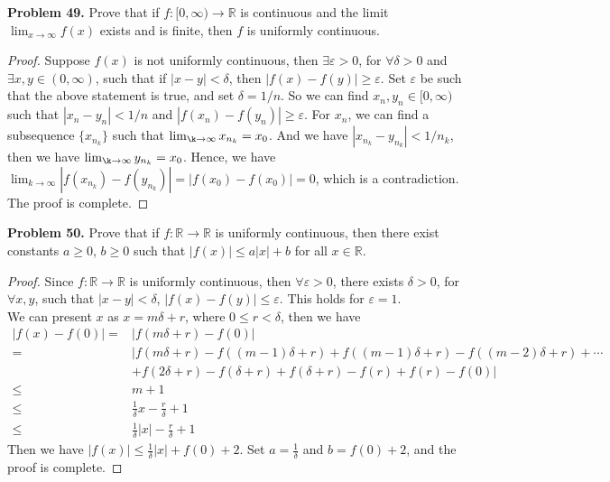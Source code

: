 \documentclass[12pt,leqno]{amsart}
\begin{document}
\medskip

\noindent
{\bf Problem 49.}
Prove that if $f:[0,\infty)\to\mathbb{R}$ is continuous and the limit $\lim_{x\to\infty} f(x)$ exists and is finite, then $f$ is uniformly continuous.
\begin{proof}
Suppose $f(x)$ is not uniformly continuous, then $\exists \varepsilon >0$, for $\forall \delta >0$ and $\exists x,y \in(0,\infty)$, such that if $|x-y|<\delta$, then $|f(x)-f(y)|\geq\varepsilon$. Set $\varepsilon$ be such that the above statement is true, and set $\delta = 1/n$. So we can find $x_n, y_n \in [0,\infty)$ such that $|x_n-y_n|<1/n$ and $|f(x_n)-f(y_n)|\geq \varepsilon$. For $x_n$, we can find a subsequence $\{x_{n_k}\}$ such that $\lim_{\k\to\infty} x_{n_k} = x_0$. And we have $|x_{n_k}-y_{n_k}|<1/n_k$, then we have $\lim_{\k\to\infty} y_{n_k} = x_0$. Hence, we have $\lim_{k\to\infty}|f(x_{n_k})-f(y_{n_k})|=|f(x_0)-f(x_0)|=0$, which is a contradiction. The proof is complete.
\end{proof}

\medskip

\noindent
{\bf Problem 50.}
Prove that if $f:\mathbb{R}\to\mathbb{R}$ is uniformly continuous, then there exist constants $a\geq 0$, $b\geq 0$ such that $\vert f(x)\vert \leq a\vert x\vert +b$ for all $x\in\mathbb{R}$.
\begin{proof}
Since $f:\mathbb{R}\to\mathbb{R}$ is uniformly continuous, then $\forall \varepsilon > 0$, there exists $\delta >0$, for $\forall x,y$, such that $|x-y|<\delta$, $|f(x)-f(y)|\leq \varepsilon$. This holds for $\varepsilon=1$. \\
\hspace*{3em}We can present $x$ as $x=m\delta +r$, where $0\leq r<\delta$, then we have 
\begin{align*}
    |f(x)-f(0)| = & |f(m\delta +r)-f(0)|\\
    = & |f(m\delta+r)-f((m-1)\delta +r)+f((m-1)\delta+r)-f((m-2)\delta+r)+\cdots \\
    & +f(2\delta+r)-f(\delta+r)+f(\delta+r)-f(r)+f(r)-f(0)| \\
    \leq & m + 1 \\
    \leq & \frac{1}{\delta}x-\frac{r}{\delta}+1 \\
    \leq & \frac{1}{\delta}|x|-\frac{r}{\delta}+1
\end{align*}
Then we have $|f(x)|\leq \frac{1}{\delta}|x|+f(0)+2$. Set $a=\frac{1}{\delta}$ and $b=f(0)+2$, and the proof is complete.
\end{proof}
\end{document}
